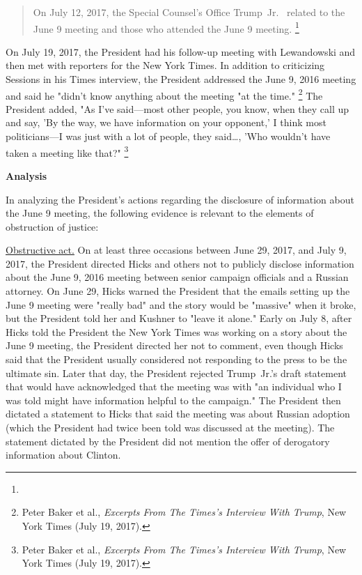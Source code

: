 {\begin{quote}
On July 12, 2017, the Special Counsel's Office  Trump~Jr.\
 related to the June 9 meeting and those who attended the June 9 meeting.%
\footnote{\blackout{Grand Jury}}
\end{quote}

On July 19, 2017, the President had his follow-up meeting with Lewandowski and then met with reporters for the New York Times.
In addition to criticizing Sessions in his Times interview, the President addressed the June 9, 2016 meeting and said he "didn't know anything about the meeting "at the time."%
\footnote{Peter Baker et al., \textit{Excerpts From The Times's Interview With Trump}, New York Times (July 19, 2017).}
The President added, "As I've said---most other people, you know, when they call up and say, 'By the way, we have information on your opponent,' I think most politicians---I was just with a lot of people, they said\dots,
'Who wouldn't have taken a meeting like that?"%
\footnote{Peter Baker et al., \textit{Excerpts From The Times's Interview With Trump}, New York Times (July 19, 2017).}

\begin{center}
\textbf{Analysis}
\end{center}

In analyzing the President's actions regarding the disclosure of information about the June 9 meeting, the following evidence is relevant to the elements of obstruction of justice:

\underline{Obstructive act.}
On at least three occasions between June 29, 2017, and July 9, 2017, the President directed Hicks and others not to publicly disclose information about the June 9, 2016 meeting between senior campaign officials and a Russian attorney.
On June 29, Hicks warned the President that the emails setting up the June 9 meeting were "really bad" and the story would be "massive" when it broke, but the President told her and Kushner to "leave it alone."
Early on July 8, after Hicks told the President the New York Times was working on a story about the June 9 meeting, the President directed her not to comment, even though Hicks said that the President usually considered not responding to the press to be the ultimate sin.
Later that day, the President rejected Trump~Jr.'s draft statement that would have acknowledged that the meeting was with "an individual who I was told might have information helpful to the campaign." The President then dictated a statement to Hicks that said the meeting was about Russian adoption (which the President had twice been told was discussed at the meeting).
The statement dictated by the President did not mention the offer of derogatory information about Clinton.

}

